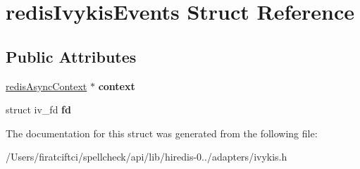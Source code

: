 \hypertarget{structredis_ivykis_events}{}\section{redis\+Ivykis\+Events Struct Reference}
\label{structredis_ivykis_events}
\subsection*{Public Attributes}
\begin{DoxyCompactItemize}
\item 
\mbox{\label{structredis_ivykis_events_aa86981727117ff22f9037cd83f3bf2a4}} 
\mbox{\hyperlink{structredis_async_context}{redis\+Async\+Context}} $\ast$ {\bfseries context}
\item 
\mbox{\label{structredis_ivykis_events_a61a944c6b4066f0478c7aeab66f1585c}} 
struct iv\+\_\+fd {\bfseries fd}
\end{DoxyCompactItemize}


The documentation for this struct was generated from the following file\+:\begin{DoxyCompactItemize}
\item 
/\+Users/firatciftci/spellcheck/api/lib/hiredis-\/0../adapters/ivykis.\+h\end{DoxyCompactItemize}
